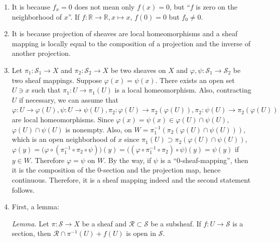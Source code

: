 \begin{enumerate}
Then there exist an open set $x \in U$ and $x \in V$ s.t. $f\colon U \rightarrow f(U)$ and $g\colon V \rightarrow g(V)$ are local homeomorphisms. 
Since $f(x)=g(x) \in f(U) \cap g(V)$, $f(U) \cap g(V)$ is nonempty. 
Also, on $W=\pi(f(U) \cap g(V))$, which is an open neighborhood of $x$, 
$f(y)=(f \circ(\pi \circ g))(y)=((f \circ \pi) \circ g)(y)=g(y)$ if $y \in W$. 
Therefore $f=g$ on $W$. Since $0$-section is continuous (and indeed a section) by Exercise 1, the second statement follows.
\item It is because $f_{x}=0$ does not mean only $f(x)=0$, 
but ``$f$ is zero on the neighborhood of $x$''. 
If $f\colon \mathbb{R} \rightarrow \mathbb{R}, x \mapsto x$, $f(0)=0$ but $f_{0} \neq 0$.
\item It is because projection of sheaves are local homeomorphisms and a sheaf mapping is locally equal to the composition of a projection and the inverse of another projection.
\item Let $\pi_{1}\colon \mathcal{S}_{1} \rightarrow X$ and $\pi_{2}\colon \mathcal{S}_{2} \rightarrow X$ be two sheaves on $X$ 
and $\varphi, \psi\colon \mathcal{S}_{1} \rightarrow \mathcal{S}_{2}$ be two sheaf mappings. Suppose $\varphi(x)=\psi(x)$. 
There exists an open set $U \ni x$ such that $\pi_{1}\colon U \rightarrow \pi_{1}(U)$ is a local homeomorphism. 
Also, contracting $U$ if necessary, we can assume that $\varphi\colon U \rightarrow \varphi(U), \psi\colon U \rightarrow \psi(U), \pi_{2}\colon \varphi(U) \rightarrow \pi_{2}(\varphi(U)), \pi_{2}\colon \psi(U) \rightarrow \pi_{2}(\varphi(U))$ are local homeomorphisms. 
Since $\varphi(x)=\psi(x) \in \varphi(U) \cap \psi(U)$, $\varphi(U) \cap \psi(U)$ is nonempty. 
Also, on $W=\pi_{1}^{-1}(\pi_{2}(\varphi(U) \cap \psi(U)))$, 
which is an open neighborhood of $x$ since $\pi_{1}(U) \supset \pi_{2}(\varphi(U) \cap \psi(U))$, 
$\varphi(y)=\big(\varphi \circ(\pi_{1}^{-1} \circ \pi_{2} \circ \psi)\big)(y)
=\big((\varphi \circ \pi_{1}^{-1} \circ \pi_{2}) \circ \psi\big)(y)=\psi(y)$ if $y \in W$. 
Therefore $\varphi=\psi$ on $W$.
By the way, if $\psi$ is a ``$0$-sheaf-mapping'', then it is the composition of the $0$-section and the projection map, hence continuous. 
Therefore, it is a sheaf mapping indeed and the second statement follows.
\item First, a lemma:

\textit{Lemma.} Let $\pi\colon \mathcal{S} \rightarrow X$ be a sheaf and $\mathcal{R} \subset \mathcal{S}$ be a subsheaf. 
If $f\colon U \rightarrow \mathcal{S}$ is a section, then $\mathcal{R} \cap \pi^{-1}(U)+f(U)$ is open in $\mathcal{S}$.


\end{enumerate}
